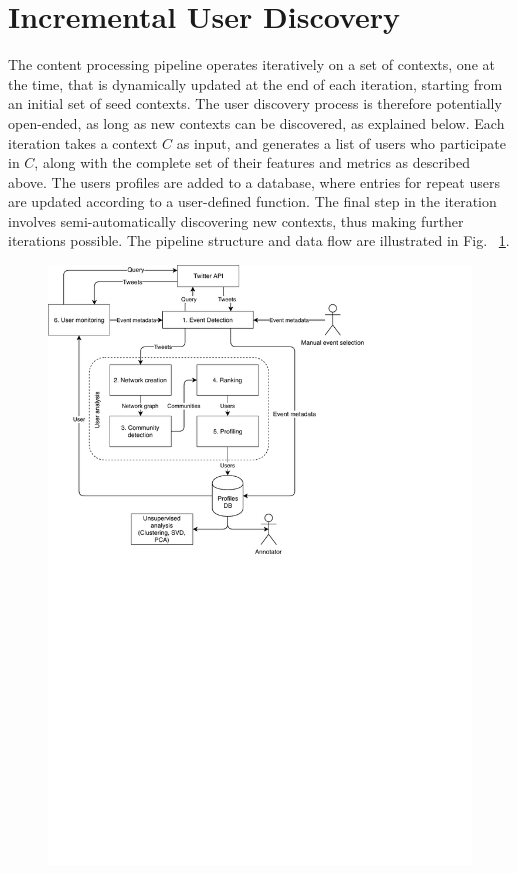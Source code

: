 \section{Incremental User Discovery} \label{sec:Pipeline}

The content processing pipeline operates iteratively on a set of contexts, one at the time, that is dynamically updated at the end of each iteration, starting from an initial set of seed contexts.
The user discovery process is therefore potentially open-ended, as long as new contexts can be discovered, as explained below.
Each iteration takes a context $C$  as input, and generates a list of users who participate in $C$, along with the complete set of their features and metrics as described above. 
The users profiles are added to a database, where entries for repeat users are updated according to a user-defined function. 
The final step in the iteration involves semi-automatically discovering new contexts, thus making further iterations possible.
%
The pipeline structure and data flow are illustrated in Fig. ~\ref{fig:twitterframework}.

\begin{figure}
	\centering
	\includegraphics[width=0.7\linewidth]{figures/TwitterFramework}
	\caption{}
	\label{fig:twitterframework}
\end{figure}

